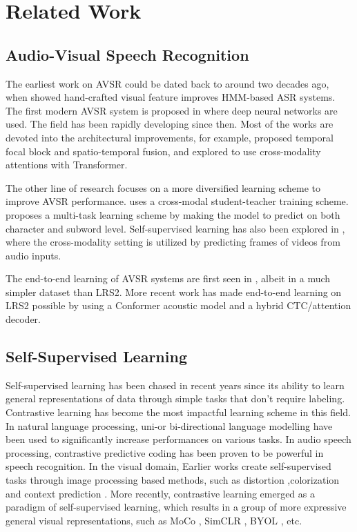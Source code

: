 \documentclass[letterpaper]{article} \usepackage{aaai22}  \usepackage{times}  \usepackage{helvet}  \usepackage{courier}  \usepackage[hyphens]{url}  \usepackage{graphicx} \urlstyle{rm} \def\UrlFont{\rm}  \usepackage{natbib}  \usepackage{caption} \usepackage{amsmath, xparse}
\begin{document}
\section{Related Work}



\subsection{Audio-Visual Speech Recognition}
The earliest work on AVSR could be dated back to around two decades ago, when \citet{early_hmm_avsr} showed hand-crafted visual feature improves HMM-based ASR systems. The first modern AVSR system is proposed in \citet{deepavsr} where deep neural networks are used. The field has been rapidly developing since then. Most of the works are devoted into the architectural improvements, for example, \citet{convseq2seq} proposed temporal focal block and spatio-temporal fusion, and \citet{lee2020audio} explored to use cross-modality attentions with Transformer. 

The other line of research focuses on a more diversified learning scheme to improve AVSR performance. \citet{li2019improving} uses a cross-modal student-teacher training scheme. \citet{paraskevopoulos2020multiresolution} proposes a multi-task learning scheme by making the model to predict on both character and subword level. Self-supervised learning has also been explored in \citet{shukla2020visually}, where the cross-modality setting is utilized by predicting frames of videos from audio inputs. 

The end-to-end learning of AVSR systems are first seen in \citet{tao2020end}, albeit in a much simpler dataset than LRS2. More recent work \cite{e2econformer} has made end-to-end learning on LRS2 possible by using a Conformer acoustic model and a hybrid CTC/attention decoder.


\subsection{Self-Supervised Learning}


Self-supervised learning has been chased in recent years since its ability to learn general representations of data through simple tasks that don't require labeling. Contrastive learning \cite{cl} has become the most impactful learning scheme in this field. In natural language processing, uni-or bi-directional language modelling \cite{brown2020language, devlin2018bert} have been used to significantly increase performances on various tasks. In audio speech processing, contrastive predictive coding \cite{wav2vec2} has been proven to be powerful in speech recognition. In the visual domain, Earlier works create self-supervised tasks through image processing based methods, such as distortion \cite{distortion},colorization \cite{colorization} and context prediction \cite{patches}. More recently, contrastive learning emerged as a paradigm of self-supervised learning, which results in a group of more expressive general visual representations, such as MoCo \cite{mocov1, mocov2}, SimCLR \cite{simclr}, BYOL \cite{byol}, etc.
\end{document}
